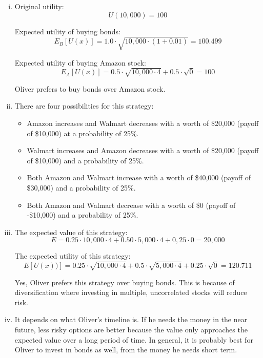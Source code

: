 \documentclass{article}
\begin{document}
\begin{enumerate}[i.]
    \item Original utility:
        $$ U( 10,000 ) = 100 $$

        Expected utility of buying bonds:
        $$ E_{B}[ U( x ) ] = 1.0 \cdot \sqrt{ 10,000 \cdot ( 1 + 0.01 )} = 100.499 $$

        Expected utility of buying Amazon stock:
        $$ E_{A}[ U( x ) ] = 0.5 \cdot \sqrt{ 10,000 \cdot 4 } + 0.5 \cdot \sqrt{ 0 }
        = 100 $$

        Oliver prefers to buy bonds over Amazon stock.

    \item There are four possibilities for this strategy: 

        \begin{itemize}
        
            \item Amazon increases and Walmart decreases with a worth of
                \$20,000 (payoff of \$10,000) at a probability of 25\%.  
        
            \item Walmart increases and Amazon decreases with a worth of
                \$20,000 (payoff of \$10,000) and a probability of 25\%. 
        
            \item Both Amazon and Walmart increase with a worth of \$40,000
                (payoff of \$30,000) and a probability of 25\%.  
                
            \item Both Amazon and Walmart decrease with a worth of \$0 (payoff
                of -\$10,000) and a  probability of 25\%.

        \end{itemize}

    \item The expected value of this strategy:
        $$ E = 0.25 \cdot 10,000 \cdot 4 + 0.50 \cdot 5,000 \cdot 4 + 0,25 \cdot
        0 = 20,000$$

        The expected utility of this strategy:
        $$ E[ U( x) ) ] = 0.25 \cdot \sqrt{ 10,000 \cdot 4 } + 0.5 \cdot \sqrt{
        5,000 \cdot 4 } + 0.25 \cdot \sqrt{ 0 } =  120.711$$

        Yes, Oliver prefers this strategy over buying bonds. This is because of
        diversification where investing in multiple, uncorrelated stocks will
        reduce risk.

    \item It depends on what Oliver's timeline is. If he needs the money in the
        near future, less risky options are better because the value only
        approaches the expected value over a long period of time. In general, it
        is probably best for Oliver to invest in bonds as well, from the money
        he needs short term.

\end{enumerate}
\end{document}
